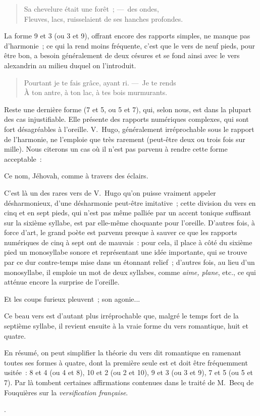 \documentclass[french,twoside]{book} %
\begin{document}
{\begin{verse}
Sa chevelure était une forêt ; — des ondes,\\
Fleuves, lacs, ruisselaient de ses hanches profondes.\\
\end{verse}
\par
\noindent La forme 9 et 3 (ou 3 et 9), offrant encore des rapports simples, ne manque pas d’harmonie ; ce qui la rend moins fréquente, c’est que le vers de neuf pieds, pour être bon, a besoin généralement de deux césures et se fond ainsi avec le vers alexandrin au milieu duquel on l’introduit.\par

\begin{verse}
Pourtant je te fais grâce, ayant ri. — Je te rends\\
À ton antre, à ton lac, à tes bois murmurants.\\
\end{verse}
\par
\noindent Reste une dernière forme (7 et 5, ou 5 et 7), qui, selon nous, est dans la plupart des cas injustifiable. Elle présente des rapports numériques complexes, qui sont fort désagréables à l’oreille. V. Hugo, généralement irréprochable sous le rapport de l’harmonie, ne l’emploie que très rarement (peut-être deux ou trois fois sur mille). Nous citerons un cas où il n’est pas parvenu à rendre cette forme acceptable :\par
Ce nom, Jéhovah, comme à travers des éclairs.\\
\par
\noindent C’est là un des rares vers de V. Hugo qu’on puisse vraiment appeler désharmonieux, d’une désharmonie peut-être imitative ; cette division du vers en cinq et en sept pieds, qui n’est pas même palliée par un accent tonique suffisant sur la sixième syllabe, est par elle-même choquante pour l’oreille. D’autres fois, à force d’art, le grand poète est parvenu presque à sauver ce que les rapports numériques de cinq à sept ont de mauvais : pour cela, il place à côté du sixième pied un monosyllabe sonore et représentant une idée importante, qui se trouve par ce dur contre-temps mise dans un étonnant relief ; d’autres fois, au lieu d’un monosyllabe, il emploie un mot de deux syllabes, comme \emph{aime, plane}, etc., ce qui atténue encore la surprise de l’oreille.\par
Et les coups furieux pleuvent ; son agonie...\\
\par
\noindent Ce beau vers est d’autant plus irréprochable que, malgré le temps fort de la septième syllabe, il revient ensuite à la vraie forme du vers romantique, huit et quatre.\par
En résumé, on peut simplifier la théorie du vers dit romantique en ramenant toutes ses formes à quatre, dont la première seule est et doit être fréquemment usitée : 8 et 4 (ou 4 et 8), 10 et 2 (ou 2 et 10), 9 et 3 (ou 3 et 9), 7 et 5 (ou 5 et 7). Par là tombent certaines affirmations contenues dans le traité de M. Becq de Fouquières sur la \emph{versification française}.
}.\par
\end{document}
